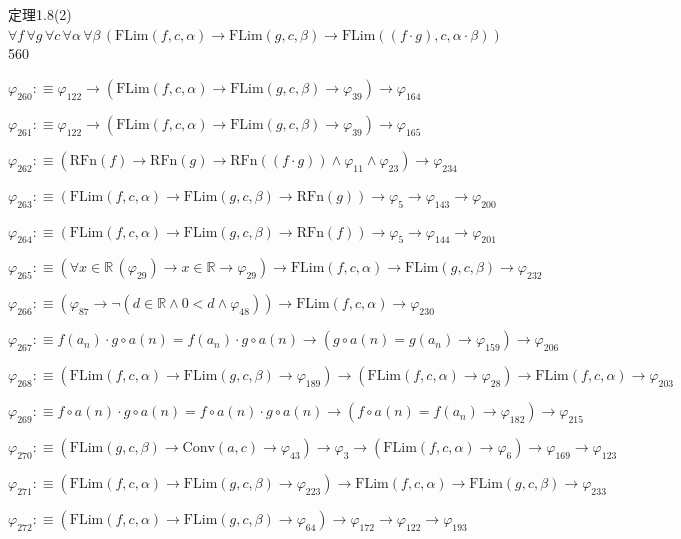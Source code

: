 \begin{fullproof}{定理1.8(2)}{$\forall f\,\forall g\,\forall c\,\forall \alpha\,\forall \beta\,(\mathrm{FLim}(f,c,\alpha) \to \mathrm{FLim}(g,c,\beta) \to \mathrm{FLim}((f \cdot g),c,\alpha \cdot \beta))$}{560}
\begin{abbrevlist}
\item $\varphi_{260} :\equiv \varphi_{122} \to (\mathrm{FLim}(f,c,\alpha) \to \mathrm{FLim}(g,c,\beta) \to \varphi_{39}) \to \varphi_{164}$
\item $\varphi_{261} :\equiv \varphi_{122} \to (\mathrm{FLim}(f,c,\alpha) \to \mathrm{FLim}(g,c,\beta) \to \varphi_{39}) \to \varphi_{165}$
\item $\varphi_{262} :\equiv (\mathrm{RFn}(f) \to \mathrm{RFn}(g) \to \mathrm{RFn}((f \cdot g)) \land \varphi_{11} \land \varphi_{23}) \to \varphi_{234}$
\item $\varphi_{263} :\equiv (\mathrm{FLim}(f,c,\alpha) \to \mathrm{FLim}(g,c,\beta) \to \mathrm{RFn}(g)) \to \varphi_{5} \to \varphi_{143} \to \varphi_{200}$
\item $\varphi_{264} :\equiv (\mathrm{FLim}(f,c,\alpha) \to \mathrm{FLim}(g,c,\beta) \to \mathrm{RFn}(f)) \to \varphi_{5} \to \varphi_{144} \to \varphi_{201}$
\item $\varphi_{265} :\equiv (\forall x \in \mathbb{R}\,(\varphi_{29}) \to x \in \mathbb{R} \to \varphi_{29}) \to \mathrm{FLim}(f,c,\alpha) \to \mathrm{FLim}(g,c,\beta) \to \varphi_{232}$
\item $\varphi_{266} :\equiv (\varphi_{87} \to \neg (d \in \mathbb{R} \land 0 < d \land \varphi_{48})) \to \mathrm{FLim}(f,c,\alpha) \to \varphi_{230}$
\item $\varphi_{267} :\equiv f(a_{n}) \cdot g \circ a(n) = f(a_{n}) \cdot g \circ a(n) \to (g \circ a(n) = g(a_{n}) \to \varphi_{159}) \to \varphi_{206}$
\item $\varphi_{268} :\equiv (\mathrm{FLim}(f,c,\alpha) \to \mathrm{FLim}(g,c,\beta) \to \varphi_{189}) \to (\mathrm{FLim}(f,c,\alpha) \to \varphi_{28}) \to \mathrm{FLim}(f,c,\alpha) \to \varphi_{203}$
\item $\varphi_{269} :\equiv f \circ a(n) \cdot g \circ a(n) = f \circ a(n) \cdot g \circ a(n) \to (f \circ a(n) = f(a_{n}) \to \varphi_{182}) \to \varphi_{215}$
\item $\varphi_{270} :\equiv (\mathrm{FLim}(g,c,\beta) \to \mathrm{Conv}(a,c) \to \varphi_{43}) \to \varphi_{3} \to (\mathrm{FLim}(f,c,\alpha) \to \varphi_{6}) \to \varphi_{169} \to \varphi_{123}$
\item $\varphi_{271} :\equiv (\mathrm{FLim}(f,c,\alpha) \to \mathrm{FLim}(g,c,\beta) \to \varphi_{223}) \to \mathrm{FLim}(f,c,\alpha) \to \mathrm{FLim}(g,c,\beta) \to \varphi_{233}$
\item $\varphi_{272} :\equiv (\mathrm{FLim}(f,c,\alpha) \to \mathrm{FLim}(g,c,\beta) \to \varphi_{64}) \to \varphi_{172} \to \varphi_{122} \to \varphi_{193}$

\end{abbrevlist}
\end{fullproof}
